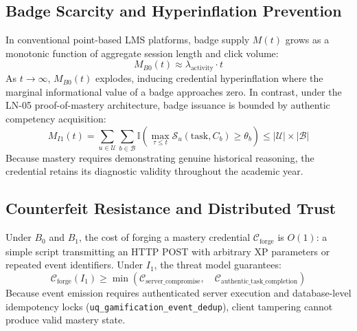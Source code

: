 \documentclass[11pt,a4paper]{article}
\begin{document}
\subsection{Badge Scarcity and Hyperinflation Prevention}
In conventional point-based LMS platforms, badge supply $M(t)$ grows as a monotonic function of aggregate session length and click volume:
\begin{equation}
M_{B0}(t) \approx \lambda_{\text{activity}} \cdot t
\end{equation}
As $t \to \infty$, $M_{B0}(t)$ explodes, inducing credential hyperinflation where the marginal informational value of a badge approaches zero. In contrast, under the LN-05 proof-of-mastery architecture, badge issuance is bounded by authentic competency acquisition:
\begin{equation}
M_{I1}(t) = \sum_{u \in \mathcal{U}} \sum_{b \in \mathcal{B}} \mathbb{I}\left( \max_{\tau \le t} \mathcal{S}_u(\text{task}, C_b) \ge \theta_b \right) \le |\mathcal{U}| \times |\mathcal{B}|
\end{equation}
Because mastery requires demonstrating genuine historical reasoning, the credential retains its diagnostic validity throughout the academic year.

\subsection{Counterfeit Resistance and Distributed Trust}
Under $B_0$ and $B_1$, the cost of forging a mastery credential $\mathcal{C}_{\text{forge}}$ is $O(1)$: a simple script transmitting an HTTP POST with arbitrary XP parameters or repeated event identifiers. Under $I_1$, the threat model guarantees:
\begin{equation}
\mathcal{C}_{\text{forge}}(I_1) \ge \min \left( \mathcal{C}_{\text{server\_compromise}}, \quad \mathcal{C}_{\text{authentic\_task\_completion}} \right)
\end{equation}
Because event emission requires authenticated server execution and database-level idempotency locks (\texttt{uq\_gamification\_event\_dedup}), client tampering cannot produce valid mastery state.
\end{document}
